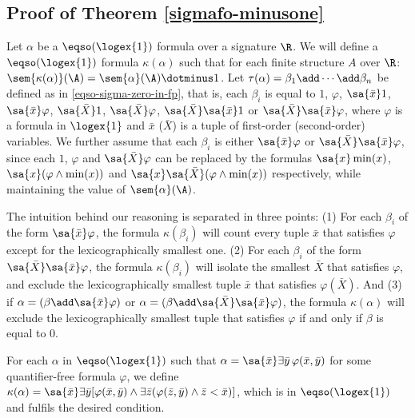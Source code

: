 \subsection*{Proof of Theorem \ref{sigmafo-minusone}}

Let $\alpha$ be a $\eqso(\logex{1})$ formula over a signature $\R$. We will define a $\eqso(\logex{1})$ formula $\kappa(\alpha)$ such that for each finite structure $A$ over $\R$: $\sem{\kappa(\alpha)}(\A) = \sem{\alpha}(\A) \dotminus 1$. Let $\tau(\alpha) = \beta_1\add\cdots\add\beta_n$ be defined as in \ref{eqso-sigma-zero-in-fp}, that is, each $\beta_i$ is equal to $1$, $\varphi$, $\sa{\bar{x}}1$, $\sa{\bar{x}}\varphi$, $\sa{\bar{X}}1$, $\sa{\bar{X}}\varphi$, $\sa{\bar{X}}\sa{\bar{x}}1$ or $\sa{\bar{X}}\sa{\bar{x}}\varphi$, where $\varphi$ is a formula in $\logex{1}$ and $\bar{x}$ ($\bar{X}$) is a tuple of first-order (second-order) variables. We further assume that each $\beta_i$ is either $\sa{\bar{x}}\varphi$ or $\sa{\bar{X}}\sa{\bar{x}}\varphi$, since each $1$, $\varphi$ and $\sa{\bar{X}}\varphi$ can be replaced by the formulas $\sa{x}\min(x)$, $\sa{x}(\varphi\wedge\min(x))$ and $\sa{x}\sa{\bar{X}}(\varphi\wedge\min(x))$ respectively, while maintaining the value of $\sem{\alpha}(\A)$. 

The intuition behind our reasoning is separated in three points: (1) For each $\beta_i$ of the form $\sa{\bar{x}}\varphi$, the formula $\kappa(\beta_i)$ will count every tuple $\bar{x}$ that satisfies $\varphi$ except for the lexicographically smallest one. (2) For each $\beta_i$ of the form $\sa{\bar{X}}\sa{\bar{x}}\varphi$, the formula $\kappa(\beta_i)$ will isolate the smallest $\bar{X}$ that satisfies $\varphi$, and exclude the lexicographically smallest tuple $\bar{x}$ that satisfies $\varphi(\bar{X})$. And (3) if $\alpha = (\beta\add\sa{\bar{x}}\varphi)$ or $\alpha = (\beta\add\sa{\bar{X}}\sa{\bar{x}}\varphi)$, the formula $\kappa(\alpha)$ will exclude the lexicographically smallest tuple that satisfies $\varphi$ if and only if $\beta$ is equal to 0.

\vspace{1em}

For each $\alpha$ in $\eqso(\logex{1})$ such that $\alpha = \sa{\bar{x}}\exists\bar{y}\,\varphi(\bar{x},\bar{y})$ for some quantifier-free formula $\varphi$, we define $\kappa(\alpha) = \sa{\bar{x}}\exists\bar{y}[\varphi(\bar{x},\bar{y})\wedge\exists\bar{z}(\varphi(\bar{z},\bar{y})\wedge\bar{z} < \bar{x})]$, which is in $\eqso(\logex{1})$ and fulfils the desired condition.

